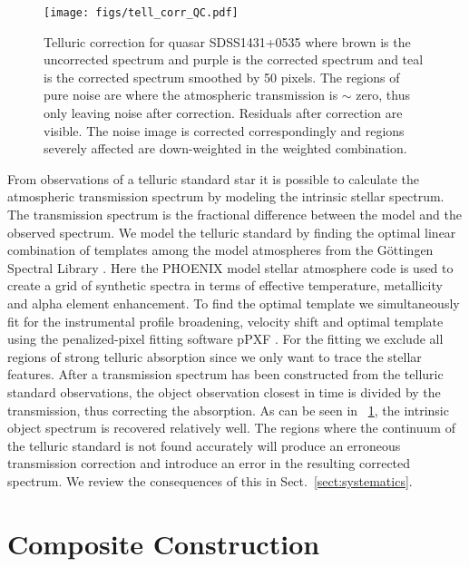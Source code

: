 \documentclass{aa}    %
\newcommand{\figref}[1]{\ref{fig:#1}}
\newcommand{\Fig}[1]{\figurename~\figref{#1}}
\newcommand{\fig}[1]{\Fig{#1}}
\newcommand{\figlabel}[1]{\label{fig:#1}}
\newcommand{\sectionname}{Sect.}
\newcommand{\Sect}[1]{\sectionname~\ref{sect:#1}}
\newcommand{\sect}[1]{\Sect{#1}}
\newcommand{\sectlabel}[1]{\label{sect:#1}}
\begin{document}
\begin{figure}[t!]
  \centering
  \texttt{[image: figs/tell\_corr\_QC.pdf]}
  \caption[]{Telluric correction for quasar SDSS1431+0535 where brown is the
uncorrected spectrum and purple is the corrected spectrum and teal is the corrected
spectrum smoothed by 50 pixels. The regions of pure noise are where the atmospheric
transmission is $\sim$ zero, thus only leaving noise after correction. Residuals
after correction are visible. The noise image is corrected correspondingly and
regions severely affected are down-weighted in the weighted combination.}
\figlabel{telluric_qc}
\end{figure}


From observations of a telluric standard star it is possible to calculate
the atmospheric transmission spectrum by modeling the intrinsic stellar
spectrum. The transmission spectrum is the fractional difference between the
model and the observed spectrum. We model the telluric standard by finding the
optimal linear combination of templates among the model atmospheres from the
G\"ottingen Spectral Library \citep{Husser2013}. Here the PHOENIX model stellar
atmosphere code is used to create a grid of synthetic spectra in terms of
effective temperature, metallicity and alpha element enhancement. To find the
optimal template we simultaneously fit for the instrumental profile broadening,
velocity shift and optimal template using the penalized-pixel fitting software
pPXF \citep{Cappellari2004}. For the fitting we exclude all regions of strong
telluric absorption since we only want to trace the stellar features. After a
transmission spectrum has been constructed from the telluric standard
observations, the object observation closest in time is divided by the
transmission, thus correcting the absorption. As can be seen in
\fig{telluric_qc}, the intrinsic object spectrum is recovered relatively well.
The regions where the continuum of the telluric standard is not found accurately
will produce an erroneous transmission correction and introduce an error in the
resulting corrected spectrum. We review the consequences of this in
\sect{systematics}. 


\section{Composite Construction}   \sectlabel{construct}
\end{document}
